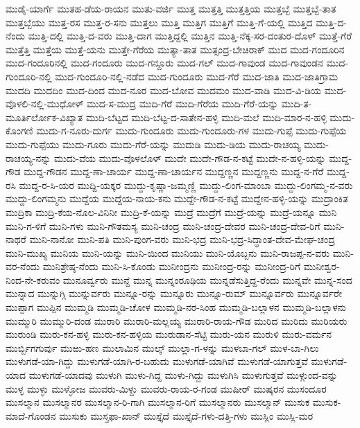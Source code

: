 ಮುಡೈ-ಯಾರ್ಗೆ
ಮುತಹ-ಡೆಯ-ರಾಯನ
ಮುತು-ವರ್ಜಿ
ಮುತ್ತ
ಮುತ್ತತ್ತಿ
ಮುತ್ತತ್ತಿಯ
ಮುತ್ತಬ್ಬೆ
ಮುತ್ತಬ್ಬೆ-ತಾತ
ಮುತ್ತಬ್ಬೆಯು
ಮುತ್ತ-ರಸ
ಮುತ್ತ-ರ-ಸನು
ಮುತ್ತಲು
ಮುತ್ತಿ
ಮುತ್ತಿಗ
ಮುತ್ತಿಗೆ
ಮುತ್ತಿ-ಗೆ-ಯಲ್ಲಿ
ಮುತ್ತಿದ
ಮುತ್ತಿ-ದ-ನೆಂದು
ಮುತ್ತಿ-ದಲ್ಲಿ
ಮುತ್ತಿ-ದ-ವರು
ಮುತ್ತಿ-ದಾಗ
ಮುತ್ತಿದ್ದಲ್ಲಿ
ಮುತ್ತಿನ
ಮುತ್ತಿ-ನೆಕ್ಕ-ಸರ-ದಂತುರ-ದೊಳ್
ಮುತ್ತೆ-ಗೆರೆ
ಮುತ್ತೆತ್ತಿ
ಮುತ್ತೆಯ
ಮುತ್ತೆ-ಯನು
ಮುತ್ತೇ-ಗೆರೆಯ
ಮುತ್ಯಾ-ತಾತ
ಮುತ್ಸಂದ್ರ-ಬೇಚಿರಾಕ್
ಮುದ
ಮುದ-ಗಂದೂರಿನ
ಮುದ-ಗಂದೂರಿನಲ್ಲಿ
ಮುದ-ಗಂದೂರು
ಮುದ-ಗನ್ದೂರು
ಮುದ-ಗಲ್
ಮುದ-ಗಾವುಂಡ
ಮುದ-ಗಾವುಂಡನ
ಮುದ-ಗುಂದೂರಿ-ನಲ್ಲಿ
ಮುದ-ಗುಂದೂರಿ-ನಲ್ಲಿ-ನಡೆದ
ಮುದ-ಗುಂದೂರು
ಮುದ-ಗೆರೆ
ಮುದ-ಜಾತಿ
ಮುದ-ಜಾತಿಗ್ರಾಮ
ಮುದದಿ
ಮುದದಿಂ
ಮುದ-ದಿಂದ
ಮುದ-ನೂರ
ಮುದ-ಬೋವ
ಮುದಮಂ
ಮುದ-ವಾಡಿ
ಮುದ-ವಿ-ಡಿಯ
ಮುದ-ವೊಳಲಿ-ನಲ್ಲಿ-ಮುಧೋಳ್
ಮುದ-ಸ-ಮುದ್ರ
ಮುದಿ-ಗೆರೆ
ಮುದಿ-ಗೆರೆಯ
ಮುದಿ-ಗೆರೆ-ಯನ್ನು
ಮುದಿ-ತ-ಮೂರ್ತಿರ್ಲೋಕ-ವಿಖ್ಯಾತ
ಮುದಿ-ಬೆಟ್ಟದ
ಮುದಿ-ಬೆಟ್ಟ-ದ-ಸಾತೇನ-ಹಳ್ಳಿ
ಮುದಿ-ಮಲೆ
ಮುದಿ-ಮಾರ-ನ-ಹಳ್ಳಿ
ಮುದು-ಕೊಂಗಣಿ
ಮುದು-ಗ-ನೂರು-ದುರ್ಗ
ಮುದು-ಗುಂದೂರು
ಮುದು-ಗುಂದೂರು-ಗಳ
ಮುದು-ಗುಪ್ಪೆ
ಮುದು-ಗುಪ್ಪೆಯ
ಮುದು-ಗುಪ್ಪೆಯು
ಮುದು-ಗೂರು
ಮುದು-ಗೆರೆ-ಯನ್ನು
ಮುದುಡಿ
ಮುದು-ಡಿಯ
ಮುದು-ರಾಚಯ್ಯ
ಮುದು-ರಾಚಯ್ಯ-ನನ್ನು
ಮುದು-ವೆಯ
ಮುದು-ವೊಳಲೊಳ್
ಮುದೇ
ಮುದೇ-ಗೌಡ-ನ-ಕಟ್ಟೆ
ಮುದೇ-ನ-ಹಳ್ಳಿ-ಯನ್ನು
ಮುದ್ದ-ಗೌಡ
ಮುದ್ದ-ಗೌಡನ
ಮುದ್ದ-ಣಾ-ಚಾರ್ಯ
ಮುದ್ದ-ಣಾ-ಚಾರ್ಯನ
ಮುದ್ದಣ್ಣನ
ಮುದ್ದಣ್ಣನು
ಮುದ್ದ-ನ-ಗೆರೆ
ಮುದ್ದ-ರಸಿ
ಮುದ್ದ-ರ-ಸಿ-ಯರ
ಮುದ್ದಿ-ಯಕ್ಕರ
ಮುದ್ದು-ಕೃಷ್ಣಾ-ಜಮ್ಮಣ್ಣಿ
ಮುದ್ದು-ಲಿಂಗ-ಮಾಂಬಾ
ಮುದ್ದು-ಲಿಂಗಮ್ಮ-ನ-ವರು
ಮುದ್ದು-ಲಿಂಗಮ್ಮನು
ಮುದ್ದೆಯ
ಮುದ್ದೆಯ-ನಾಯ-ಕನು
ಮುದ್ದೇ-ಗೌಡ-ನ-ಕಟ್ಟೆ
ಮುದ್ದೇನ-ಹಳ್ಳಿ-ಯನ್ನು
ಮುದ್ರಾಂಕಿತ
ಮುದ್ರಿಕಾ
ಮುದ್ರಿ-ಕೆಯ-ನೊಲ-ವಿನಿನೀ
ಮುದ್ರಿ-ಕೆ-ಯನ್ನು
ಮುದ್ರೆ
ಮುದ್ರೆಗೆ
ಮುದ್ರೆ-ಯನ್ನು
ಮುದ್ರೆ-ಯನ್ನೂ
ಮುನಿ
ಮುನಿ-ಗ-ಳಿಗೆ
ಮುನಿ-ಗಳು
ಮುನಿ-ಗೌತಮಸ್ಯ
ಮುನಿ-ಚಂದ್ರ
ಮುನಿ-ಚಂದ್ರ-ದೇವರ
ಮುನಿ-ಚಂದ್ರ-ದೇವ-ರಿಗೆ
ಮುನಿ-ನಾಥರೆ
ಮುನಿ-ನಾನೋ
ಮುನಿ-ಪತಿ
ಮುನಿ-ಪುಂಗ-ವರು
ಮುನಿ-ಭದ್ರ
ಮುನಿ-ಭದ್ರ-ಸಿದ್ಧಾಂತ-ದೇವ-ಮೇಘ-ಚಂದ್ರ
ಮುನಿ-ಮುಖ್ಯ
ಮುನಿಯ
ಮುನಿ-ಯನ್ನು
ಮುನಿ-ಯಿಂದ
ಮುನಿಯು
ಮುನಿ-ಯೊಬ್ಬನು
ಮುನಿ-ರಾಜಪ್ಪ-ನ-ವರು
ಮುನಿ-ವರ-ನೆಂದು
ಮುನಿಶ್ರೇಷ್ಠ-ನೆಂದು
ಮುನಿ-ಸಿ-ಕೊಂಡು
ಮುನೀಂದ್ರನು
ಮುನೀಂದ್ರ-ರನ್ನು
ಮುನೀಂದ್ರ-ರಿಗೆ
ಮುನೀಶ್ವರ-ನಿಂದ-ನೇ-ಕರುವಂ
ಮುನೂರ್ವ್ವರು
ಮುನ್ದೆ
ಮುನ್ನ
ಮುನ್ನಂರೂಢಿಯ
ಮುನ್ನಡೆಸುತ್ತಿದ್ದ-ರೆಂದು
ಮುನ್ನವೇ
ಮುನ್ನ-ಸಂದ
ಮುನ್ನಾದ
ಮುನ್ನುಗ್ಗಿ
ಮುನ್ನುರ್ವರು
ಮುನ್ನೂ-ರನ್ನು
ಮುನ್ನೂರು
ಮುನ್ನೂ-ರುಮ್
ಮುನ್ನೂರ್ವರು
ಮುನ್ನೂರ್ವರೇ
ಮುಪ್ಪಾಗ
ಮುಪ್ಪಿನ
ಮುಮ್ಮಡಿ
ಮುಮ್ಮಡಿ-ಚೋಳ
ಮುಮ್ಮಡಿ-ನರ-ಸಿಂಹ
ಮುಮ್ಮಡಿ-ಬಲ್ಲಾಳನ
ಮುಮ್ಮಡಿ-ಬಲ್ಲಾಳನು
ಮುಮ್ಮುರಿ
ಮುಮ್ಮುರಿ-ದಂಡ
ಮುರಾರಿ
ಮುರಾರಿ-ಮಲ್ಲಯ್ಯ
ಮುರಾರಿ-ರಾಯ-ಗೌಡ
ಮುರಿದ
ಮುರಿದು
ಮುರಿಯರು
ಮುರುಂಡಿ
ಮುರು-ಕನ-ಹಳ್ಳಿ
ಮುರು-ಕನ-ಹಳ್ಳಿಯ
ಮುರುಡಾನ-ಸೆಟ್ಟಿ
ಮುರು-ಯನ
ಮುರುಳಿ
ಮುರು-ವರ್ಮನ
ಮುರ್ಬ್ಬಿಗಗುರ್ವು
ಮುಱು-ಹಣ
ಮುಲಾಮಿನ
ಮುಲ್ಕ್
ಮುಲ್ಲಾ-ಗ-ಳನ್ನು
ಮುಳಬಾ-ಗಲ್
ಮುಳ-ಬಾ-ಗಿಲು
ಮುಳುಗಡೆ-ಯಾ-ಗಿದ್ದು
ಮುಳುಗಡೆ-ಯಾಗಿ-ರ-ಬಹುದು
ಮುಳುಗಡೆ-ಯಾಗಿವೆ
ಮುಳುಗಡೆ-ಯಾಗುತ್ತವೆ
ಮುಳುಗಡೆ-ಯಾದ
ಮುಳುಗಡೆ-ಯಾದವು
ಮುಳುಗಿ
ಮುಳು-ಗಿದ್ದ
ಮುಳು-ಗಿದ್ದು
ಮುಳುಗಿಸಿ
ಮುಳುಗುತ್ತವೆ
ಮುಳ್ಗುಂದ-ವನ್ನು
ಮುಳ್ಳ
ಮುಳ್ಳು
ಮುಳ್ಳೋಜ
ಮುವರು-ಮಿಳ್ದು
ಮುವರು-ರಾಯ-ರ-ಗಂಡ
ಮುಷೀರ್
ಮುಷ್ಕರನ
ಮುಸಂದೂರ
ಮುಸಲ್ಮಾನ
ಮುಸಲ್ಮಾನರ
ಮುಸಲ್ಮಾನ-ರಿ-ಗಾಗಿ
ಮುಸಲ್ಮಾನ-ರಿಗೆ
ಮುಸಲ್ಮಾನರು
ಮುಸಲ್ಮಾನ್
ಮುಸುಕ
ಮುಸುಕ-ಮಾದೆ-ಗೊಂಡನ
ಮುಸುಕು
ಮುಸ್ತಫಾ-ಖಾನ್
ಮುಸ್ತೈದೆ
ಮುಸ್ತೈದೆ-ಗಳು-ದತ್ತಿ-ಗಳು
ಮುಸ್ಲಿಂ
ಮುಸ್ಲಿ-ಮರ
